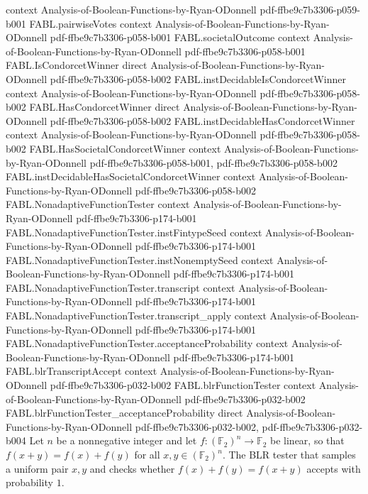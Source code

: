 \begin{theorem}
  {context}
  {Analysis-of-Boolean-Functions-by-Ryan-ODonnell}
  {pdf-ffbe9c7b3306-p059-b001}
\proofstep
  {FABL.pairwiseVotes}
  {context}
  {Analysis-of-Boolean-Functions-by-Ryan-ODonnell}
  {pdf-ffbe9c7b3306-p058-b001}
\proofstep
  {FABL.societalOutcome}
  {context}
  {Analysis-of-Boolean-Functions-by-Ryan-ODonnell}
  {pdf-ffbe9c7b3306-p058-b001}
\proofstep
  {FABL.IsCondorcetWinner}
  {direct}
  {Analysis-of-Boolean-Functions-by-Ryan-ODonnell}
  {pdf-ffbe9c7b3306-p058-b002}
\proofstep
  {FABL.instDecidableIsCondorcetWinner}
  {context}
  {Analysis-of-Boolean-Functions-by-Ryan-ODonnell}
  {pdf-ffbe9c7b3306-p058-b002}
\proofstep
  {FABL.HasCondorcetWinner}
  {direct}
  {Analysis-of-Boolean-Functions-by-Ryan-ODonnell}
  {pdf-ffbe9c7b3306-p058-b002}
\proofstep
  {FABL.instDecidableHasCondorcetWinner}
  {context}
  {Analysis-of-Boolean-Functions-by-Ryan-ODonnell}
  {pdf-ffbe9c7b3306-p058-b002}
\proofstep
  {FABL.HasSocietalCondorcetWinner}
  {context}
  {Analysis-of-Boolean-Functions-by-Ryan-ODonnell}
  {pdf-ffbe9c7b3306-p058-b001,
    pdf-ffbe9c7b3306-p058-b002}
\proofstep
  {FABL.instDecidableHasSocietalCondorcetWinner}
  {context}
  {Analysis-of-Boolean-Functions-by-Ryan-ODonnell}
  {pdf-ffbe9c7b3306-p058-b002}
\proofstep
  {FABL.NonadaptiveFunctionTester}
  {context}
  {Analysis-of-Boolean-Functions-by-Ryan-ODonnell}
  {pdf-ffbe9c7b3306-p174-b001}
\proofstep
  {FABL.NonadaptiveFunctionTester.instFintypeSeed}
  {context}
  {Analysis-of-Boolean-Functions-by-Ryan-ODonnell}
  {pdf-ffbe9c7b3306-p174-b001}
\proofstep
  {FABL.NonadaptiveFunctionTester.instNonemptySeed}
  {context}
  {Analysis-of-Boolean-Functions-by-Ryan-ODonnell}
  {pdf-ffbe9c7b3306-p174-b001}
\proofstep
  {FABL.NonadaptiveFunctionTester.transcript}
  {context}
  {Analysis-of-Boolean-Functions-by-Ryan-ODonnell}
  {pdf-ffbe9c7b3306-p174-b001}
\proofstep
  {FABL.NonadaptiveFunctionTester.transcript_apply}
  {context}
  {Analysis-of-Boolean-Functions-by-Ryan-ODonnell}
  {pdf-ffbe9c7b3306-p174-b001}
\proofstep
  {FABL.NonadaptiveFunctionTester.acceptanceProbability}
  {context}
  {Analysis-of-Boolean-Functions-by-Ryan-ODonnell}
  {pdf-ffbe9c7b3306-p174-b001}
\proofstep
  {FABL.blrTranscriptAccept}
  {context}
  {Analysis-of-Boolean-Functions-by-Ryan-ODonnell}
  {pdf-ffbe9c7b3306-p032-b002}
\proofstep
  {FABL.blrFunctionTester}
  {context}
  {Analysis-of-Boolean-Functions-by-Ryan-ODonnell}
  {pdf-ffbe9c7b3306-p032-b002}
\proofstep
  {FABL.blrFunctionTester_acceptanceProbability}
  {direct}
  {Analysis-of-Boolean-Functions-by-Ryan-ODonnell}
  {pdf-ffbe9c7b3306-p032-b002,
    pdf-ffbe9c7b3306-p032-b004}
Let $n$ be a nonnegative integer and let $f:(\mathbb F_2)^n\to\mathbb F_2$ be linear, so
that $f(x+y)=f(x)+f(y)$ for all $x,y\in(\mathbb F_2)^n$. The BLR tester that samples a
uniform pair $x,y$ and checks whether $f(x)+f(y)=f(x+y)$ accepts with probability $1$.
\end{theorem}

